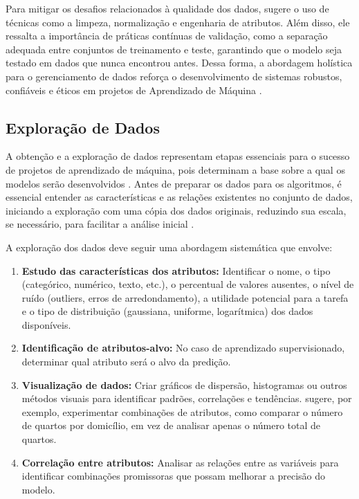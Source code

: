 Para mitigar os desafios relacionados à qualidade dos dados,  sugere o uso de técnicas como a limpeza, normalização e engenharia de atributos. Além disso, ele ressalta a importância de práticas contínuas de validação, como a separação adequada entre conjuntos de treinamento e teste, garantindo que o modelo seja testado em dados que nunca encontrou antes. Dessa forma, a abordagem holística para o gerenciamento de dados reforça o desenvolvimento de sistemas robustos, confiáveis e éticos em projetos de Aprendizado de Máquina \cite{geron2017}.

\subsection{Exploração de Dados}
A obtenção e a exploração de dados representam etapas essenciais para o sucesso de projetos de aprendizado de máquina, pois determinam a base sobre a qual os modelos serão desenvolvidos \cite{geron2017}. Antes de preparar os dados para os algoritmos, é essencial entender as características e as relações existentes no conjunto de dados, iniciando a exploração com uma cópia dos dados originais, reduzindo sua escala, se necessário, para facilitar a análise inicial \cite{geron2017}.

A exploração dos dados deve seguir uma abordagem sistemática que envolve:

\begin{enumerate}
    \item \textbf{Estudo das características dos atributos:} Identificar o nome, o tipo (categórico, numérico, texto, etc.), o percentual de valores ausentes, o nível de ruído (outliers, erros de arredondamento), a utilidade potencial para a tarefa e o tipo de distribuição (gaussiana, uniforme, logarítmica) dos dados disponíveis.
    \item \textbf{Identificação de atributos-alvo:} No caso de aprendizado supervisionado, determinar qual atributo será o alvo da predição.
    \item \textbf{Visualização de dados:} Criar gráficos de dispersão, histogramas ou outros métodos visuais para identificar padrões, correlações e tendências.  sugere, por exemplo, experimentar combinações de atributos, como comparar o número de quartos por domicílio, em vez de analisar apenas o número total de quartos.
    \item \textbf{Correlação entre atributos:} Analisar as relações entre as variáveis para identificar combinações promissoras que possam melhorar a precisão do modelo.
\end{enumerate}

